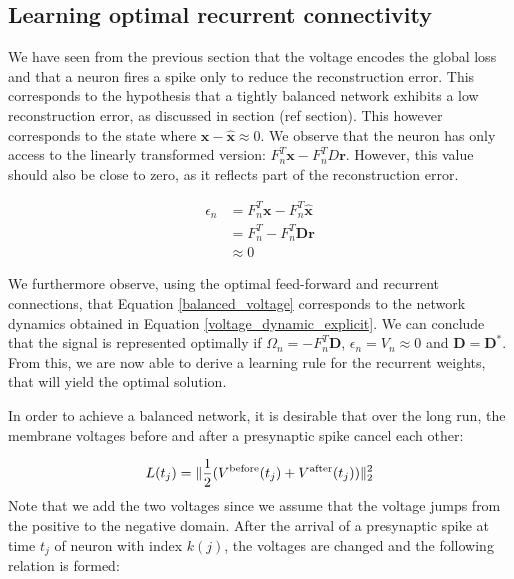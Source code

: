 \documentclass[twoside,11pt]{article}
\begin{document}
\subsection{Learning optimal recurrent connectivity}
We have seen from the previous section that the voltage encodes the global loss and
that a neuron fires a spike only to reduce the reconstruction error.
This corresponds to the hypothesis that a tightly balanced network exhibits a low reconstruction
error, as discussed in section (ref section).
This however corresponds to the state where $\mathbf{x} - \mathbf{\hat{x}} \approx 0$.
We observe that the neuron has only access to the linearly transformed version: $F_n^T\mathbf{x} - F_n^TD\mathbf{r}$. 
However, this value should also be close to zero, as it reflects part of the reconstruction error.

\begin{equation} \label{balanced_voltage}
  \begin{split}
    \epsilon_n &= F^T_n\mathbf{x}-F^T_n\mathbf{\hat{x}} \\
    &= F_n^T - F^T_n\mathbf{Dr} \\
    &\approx 0
  \end{split}
\end{equation}

We furthermore observe, using the optimal feed-forward and recurrent connections, that Equation
\ref{balanced_voltage} corresponds to the network dynamics obtained in Equation \ref{voltage_dynamic_explicit}.
We can conclude that the signal is represented optimally if $\Omega_n = -F^T_n\mathbf{D}$, $\epsilon_n = V_n \approx 0$ and
$\mathbf{D} = \mathbf{D}^*$.
From this, we are now able to derive a learning rule for the recurrent weights, that will yield
the optimal solution.

In order to achieve a balanced network, it is desirable that over the long run, the
membrane voltages before and after a presynaptic spike cancel each other:

\begin{equation} \label{loss_voltage_before_after}
  L(t_j) = \| \frac{1}{2} (V^{\textnormal{before}}(t_j)+V^{\textnormal{after}}(t_j)) \| ^2_2
\end{equation}
Note that we add the two voltages since we assume that the voltage jumps from the positive to the
negative domain.
After the arrival of a presynaptic spike at time $t_j$ of neuron with index $k(j)$, the voltages are changed and the following relation is formed:
\end{document}
